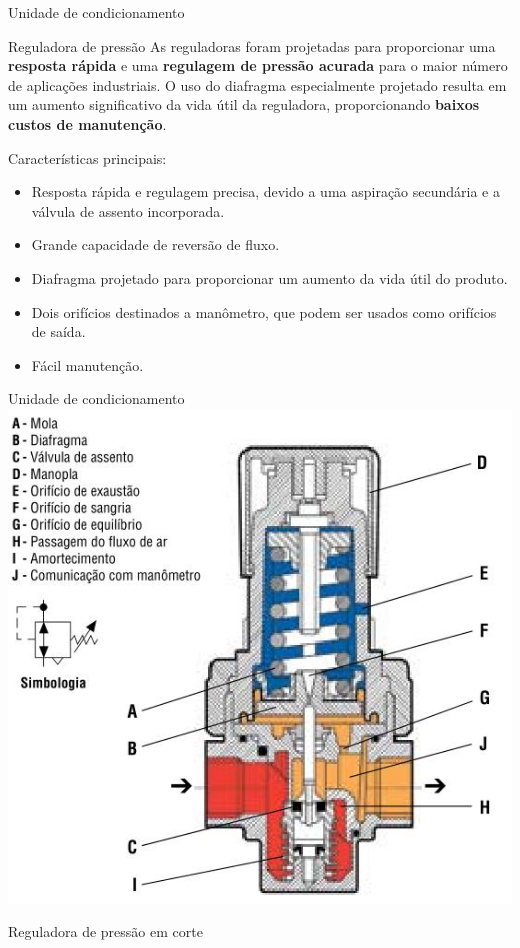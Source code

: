 \begin{frame}{Unidade de condicionamento}
	\begin{block}{Reguladora de pressão}
		As reguladoras foram projetadas para proporcionar uma \textbf{resposta rápida} e uma \textbf{regulagem de pressão acurada} para o maior número de aplicações industriais. O uso do diafragma especialmente projetado resulta em um aumento significativo da vida útil da reguladora, proporcionando \textbf{baixos custos de manutenção}.
		
		\smallskip
		
		Características principais:
		\begin{itemize}
			\item Resposta rápida e regulagem precisa, devido a uma aspiração secundária e a válvula de assento incorporada.
			\item Grande capacidade de reversão de fluxo.
			\item Diafragma projetado para proporcionar um aumento da vida útil do produto.
			\item Dois orifícios destinados a manômetro, que podem ser usados como orifícios de saída.
			\item Fácil manutenção.
		\end{itemize}
	\end{block}
\end{frame}


\begin{frame}{Unidade de condicionamento}
	\centering
	\includegraphics[height=0.8\textheight]{Figuras/Ch13/fig17}
	
	Reguladora de pressão em corte
\end{frame}


